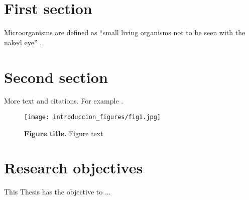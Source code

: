 
\section{First section}
Microorganisms are defined as “small living organisms not to be seen with the naked eye” \parencite{Singh2004}. 

\section{Second section}
More text and citations. For example \cite{Beja2000, Rondon2000, Nesbo2005}.

\begin{figure}[h]
\centering
\texttt{[image: introduccion\_figures/fig1.jpg]}
\caption{\textbf{Figure title.} Figure text}
\label{fig:1.2-1}
\end{figure}

\newpage
\section{Research objectives}
This Thesis has the objective to ...\\
